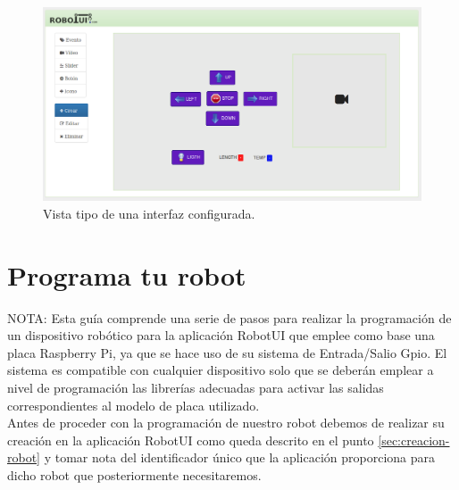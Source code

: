 \begin{figure}[H]
  \begin{center}
    \includegraphics[scale=.4]{imagenes/manual-usuario/interfaz-creada.png}
  \end{center}
  \caption{Vista tipo de una interfaz configurada.}
  \label{website:pagina-principal}
\end{figure}



\section{ Programa tu robot }
\label{sec:programacion-robot}

NOTA: Esta guía comprende una serie de pasos para realizar la programación de un dispositivo robótico para la aplicación RobotUI que emplee como base una placa Raspberry Pi, ya que se hace uso de su sistema de Entrada/Salio Gpio. 
El sistema es compatible con cualquier dispositivo solo que se deberán emplear a nivel de programación las librerías adecuadas para activar las salidas correspondientes al modelo de placa utilizado.\\


Antes de proceder con la programación de nuestro robot debemos de realizar su creación en la aplicación RobotUI como queda descrito en el punto \ref{sec:creacion-robot} y 
tomar nota del identificador único que la aplicación proporciona para dicho robot que posteriormente necesitaremos.\\	

